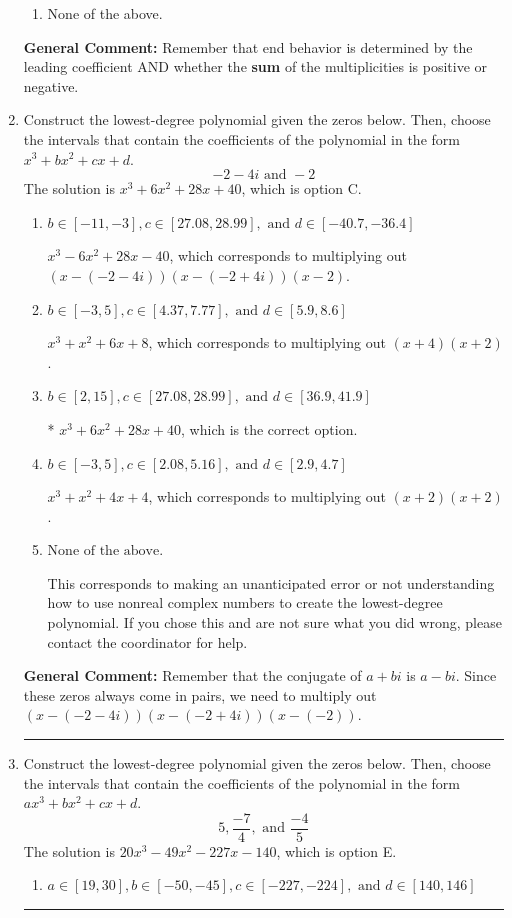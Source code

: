 \documentclass{extbook}[14pt]
\newcommand{\litem}[1]{\item #1

\rule{\textwidth}{0.4pt}}
\begin{document}
\begin{enumerate}
{\begin{enumerate}[label=\Alph*.]
\begin{multicols}{2}
\end{multicols}\item None of the above.\end{enumerate}
\textbf{General Comment:} Remember that end behavior is determined by the leading coefficient AND whether the \textbf{sum} of the multiplicities is positive or negative.
}
\litem{
Construct the lowest-degree polynomial given the zeros below. Then, choose the intervals that contain the coefficients of the polynomial in the form $x^3+bx^2+cx+d$.
\[ -2 - 4 i \text{ and } -2 \]The solution is \( x^{3} +6 x^{2} +28 x + 40 \), which is option C.\begin{enumerate}[label=\Alph*.]
\item \( b \in [-11, -3], c \in [27.08, 28.99], \text{ and } d \in [-40.7, -36.4] \)

$x^{3} -6 x^{2} +28 x -40$, which corresponds to multiplying out $(x-(-2 - 4 i))(x-(-2 + 4 i))(x -2)$.
\item \( b \in [-3, 5], c \in [4.37, 7.77], \text{ and } d \in [5.9, 8.6] \)

$x^{3} + x^{2} +6 x + 8$, which corresponds to multiplying out $(x + 4)(x + 2)$.
\item \( b \in [2, 15], c \in [27.08, 28.99], \text{ and } d \in [36.9, 41.9] \)

* $x^{3} +6 x^{2} +28 x + 40$, which is the correct option.
\item \( b \in [-3, 5], c \in [2.08, 5.16], \text{ and } d \in [2.9, 4.7] \)

$x^{3} + x^{2} +4 x + 4$, which corresponds to multiplying out $(x + 2)(x + 2)$.
\item \( \text{None of the above.} \)

This corresponds to making an unanticipated error or not understanding how to use nonreal complex numbers to create the lowest-degree polynomial. If you chose this and are not sure what you did wrong, please contact the coordinator for help.
\end{enumerate}

\textbf{General Comment:} Remember that the conjugate of $a+bi$ is $a-bi$. Since these zeros always come in pairs, we need to multiply out $(x-(-2 - 4 i))(x-(-2 + 4 i))(x-(-2))$.
}
\litem{
Construct the lowest-degree polynomial given the zeros below. Then, choose the intervals that contain the coefficients of the polynomial in the form $ax^3+bx^2+cx+d$.
\[ 5, \frac{-7}{4}, \text{ and } \frac{-4}{5} \]The solution is \( 20x^{3} -49 x^{2} -227 x -140 \), which is option E.\begin{enumerate}[label=\Alph*.]
\item \( a \in [19, 30], b \in [-50, -45], c \in [-227, -224], \text{ and } d \in [140, 146] \)


\end{enumerate}}
\end{enumerate}
\end{document}
